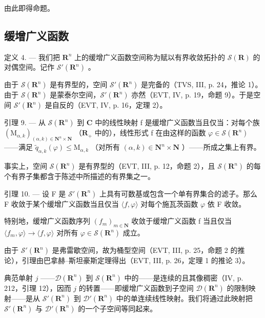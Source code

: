 由此即得命题。

\subsection{缓增广义函数}

定义 4. --- 我们把 \(\mathbf{R}^{n}\) 上的缓增广义函数空间称为赋以有界收敛拓扑的 \(\mathcal{S}(\mathbf{R})\) 的对偶空间。记作 \(\mathcal{S}'(\mathbf{R}^{n})\) 。

由于 \(\mathcal{S}(\mathbf{R}^n)\) 是有界型的，空间 \(\mathcal{S}'(\mathbf{R}^n)\) 是完备的（TVS, III, p. 24，推论 1）。由于 \(\mathcal{S}(\mathbf{R}^n)\) 是蒙泰尔空间，\(\mathcal{S}'(\mathbf{R}^n)\) 亦然（EVT, IV, p. 19，命题 9）。于是空间 \(\mathcal{S}'(\mathbf{R}^n)\) 是自反的（EVT, IV, p. 16，定理 2）。

引理 9. --- 从 \(\mathcal{S}(\mathbf{R}^{n})\) 到 \(\mathbf{C}\) 中的线性映射 f 是缓增广义函数当且仅当：对每个族 \((\mathrm{M}_{\alpha,k})_{(\alpha,k)\in\mathbf{N}^{n}\times\mathbf{N}}\) （\(\mathbf{R}_{+}\) 中的），线性形式 f 在由这样的函数 \(\varphi\in\mathcal{S}(\mathbf{R}^{n})\) ——满足 \(\widetilde{q}_{\alpha,k}(\varphi)\leqslant\mathrm{M}_{\alpha,k}\) （对所有 \((\alpha,k)\in\mathbf{N}^{n}\times\mathbf{N}\) ）——所成之集上有界。

事实上，空间 \(\mathcal{S}(\mathbf{R}^{n})\) 是有界型的（EVT, III, p. 12，命题 2），且 \(\mathcal{S}(\mathbf{R}^{n})\) 的每个有界子集都含于陈述中所描述的有界集之一。

引理 10. --- 设 F 是 \(\mathcal{S}'(\mathbf{R}^n)\) 上具有可数基或包含一个单有界集合的滤子。那么 F 收敛于某个缓增广义函数当且仅当 \(\langle f, \varphi \rangle\) 对每个施瓦茨函数 \(\varphi\) 依 F 收敛。

特别地，缓增广义函数序列 \((f_{m})_{m\in\mathbf{N}}\) 收敛于缓增广义函数 f 当且仅当 \(\langle f_{m},\varphi\rangle\to\langle f,\varphi\rangle\) 对所有 \(\varphi\in\mathcal{S}(\mathbf{R}^{n})\) 成立。

由于 \(\mathcal{S}'(\mathbf{R}^n)\) 是弗雷歇空间，故为桶型空间（EVT, III, p. 25，命题 2 的推论），引理由巴拿赫–斯坦豪斯定理得出（EVT, III, p. 26，定理 1 的推论 3）。

典范单射 \(j\) ——\(\mathcal{D}(\mathbf{R}^{n})\) 到 \(\mathcal{S}(\mathbf{R}^{n})\) 中的——是连续的且其像稠密（IV, p. 212，引理 12），因而 \(j\) 的转置——即缓增广义函数到子空间 \(\mathcal{D}(\mathbf{R}^{n})\) 的限制映射——是从 \(\mathcal{S}'(\mathbf{R}^{n})\) 到 \(\mathcal{D}'(\mathbf{R}^{n})\) 中的单连续线性映射。我们将通过此映射把 \(\mathcal{S}'(\mathbf{R}^{n})\) 与 \(\mathcal{D}'(\mathbf{R}^{n})\) 的一个子空间等同起来。

